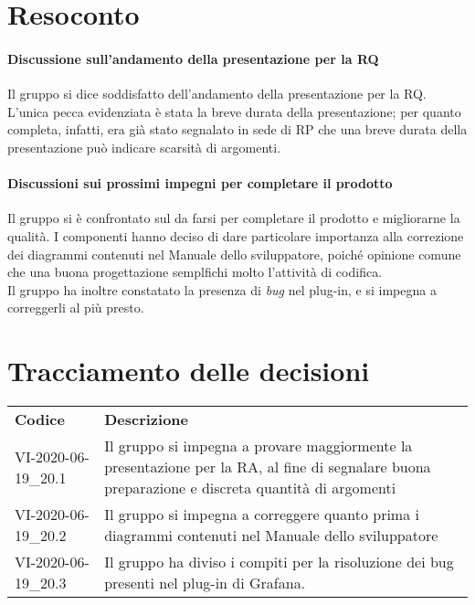 \documentclass{article}
\begin{document}
\section{Resoconto}%
\label{resoconto}
\paragraph*{Discussione sull'andamento della presentazione per la RQ}
Il gruppo si dice soddisfatto dell'andamento della presentazione per la RQ. L'unica pecca evidenziata è stata la breve durata della presentazione; per quanto 
completa, infatti, era già stato segnalato in sede di RP che una breve durata della presentazione può indicare scarsità di argomenti.

\paragraph*{Discussioni sui prossimi impegni per completare il prodotto}
Il gruppo si è confrontato sul da farsi per completare il prodotto e migliorarne la qualità. I componenti hanno deciso di dare particolare importanza alla correzione 
dei diagrammi contenuti nel Manuale dello sviluppatore, poiché opinione comune che una buona progettazione semplfichi molto l'attività di codifica. \\
Il gruppo ha inoltre constatato la presenza di \textit{bug} nel plug-in, e si impegna a correggerli al più presto.

\section{Tracciamento delle decisioni}
\begin{table}[H]
  \centering
  \begin{tabular}{p{4cm}|p{12cm}}
    \rowcolor{lightgray}
    \textbf{Codice}  & \textbf{Descrizione}      \\
    VI-2020-06-19\_20.1 & Il gruppo si impegna a provare maggiormente la presentazione per la RA, al fine di segnalare buona preparazione e discreta quantità di argomenti \\
    VI-2020-06-19\_20.2 & Il gruppo si impegna a correggere quanto prima i diagrammi contenuti nel Manuale dello sviluppatore \\
    VI-2020-06-19\_20.3 & Il gruppo ha diviso i compiti per la risoluzione dei bug presenti nel plug-in di Grafana.
  \end{tabular}
\end{table}
\end{document}
